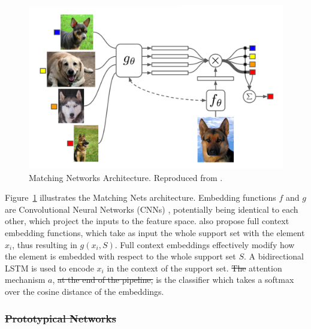 \documentclass[journal=jcisd8,manuscript=article]{achemso} %
\providecommand{\DIFadd}[1]{{\protect\color{blue}\uwave{#1}}} %
\providecommand{\DIFdel}[1]{{\protect\color{red}\sout{#1}}}                      %
\providecommand{\DIFaddbegin}{} %
\providecommand{\DIFaddend}{} %
\providecommand{\DIFdelbegin}{} %
\providecommand{\DIFdelend}{} %
\begin{document}
\begin{figure}[!ht]
    \centering
    \includegraphics[width=0.7\linewidth]{img/matching_networks.png}
    \caption[Matching Networks Architecture]{Matching Networks Architecture. Reproduced from \citet{vinyals2016matching}.}
    \label{fig:matchingnets}
\end{figure}

Figure~\ref{fig:matchingnets} illustrates the Matching Nets architecture. Embedding functions $f$ and $g$ are Convolutional Neural Networks (CNNs) \citep{lecun1995convolutional}, potentially being identical to each other, which project the inputs to the feature space. \citet{vinyals2016matching} also propose full context embedding functions, which take as input the whole support set with the element $x_i$, thus resulting in \( g(x_i, S) \). Full context embeddings effectively modify how the element is embedded with respect to the whole support set $S$. A bidirectional LSTM is used to encode $x_i$ in the context of the support set. \DIFdelbegin \DIFdel{The }\DIFdelend \DIFaddbegin \DIFadd{Finally, the }\DIFaddend attention mechanism $a$, \DIFdelbegin \DIFdel{at the end of the pipeline, }\DIFdelend is the classifier which takes a softmax over the cosine distance of the embeddings. \DIFdelbegin %

\subsubsection{\DIFdel{Prototypical Networks}}
\addtocounter{subsubsection}{-1}%
\end{document}
